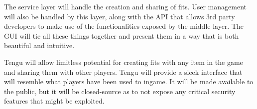 The service layer will handle the creation and sharing of fits. User management will also be handled by this layer, along with the API that allows 3rd party developers to make use of the functionalities exposed by the middle layer. The GUI will tie all these things together and present them in a way that is both beautiful and intuitive.

Tengu will allow limitless potential for creating fits with any item in the game and sharing them with other players. Tengu will provide a sleek interface that will resemble what players have been used to ingame. It will be made available to the public, but it will be closed-source as to not expose any critical security features that might be exploited.

